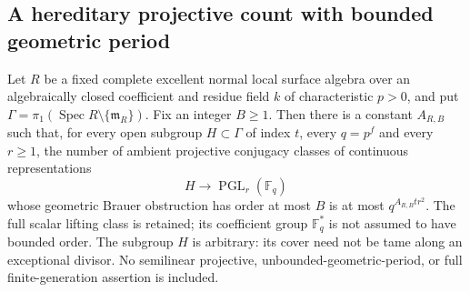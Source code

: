 \subsection{A hereditary projective count with bounded geometric period}

\begin{theorem}
\label{D:bounded-period-hereditary-projective-growth}
Let $R$ be a fixed complete excellent normal local surface
algebra over an algebraically closed coefficient and residue
field $k$ of characteristic $p>0$, and put
$\Gamma=\pi_1(\operatorname{Spec}R\setminus\{\mathfrak m_R\})$.
Fix an integer $B\ge1$.
Then there is a constant $A_{R,B}$ such that, for every open
subgroup $H\subset\Gamma$ of index $t$, every $q=p^f$ and
every $r\ge1$, the number of ambient projective conjugacy
classes of continuous representations
\[
                   H\longrightarrow\operatorname{PGL}_r(\mathbb F_q)
                                                        \tag{D.BH.1}
\]
whose geometric Brauer obstruction has order at most $B$ is
at most $q^{A_{R,B}tr^2}$.
The full scalar lifting class is retained; its coefficient
group $\mathbb F_q^*$ is not assumed to have bounded order.
The subgroup $H$ is arbitrary: its cover need not be tame
along an exceptional divisor. No semilinear projective,
unbounded-geometric-period, or full finite-generation
assertion is included.
\end{theorem}

